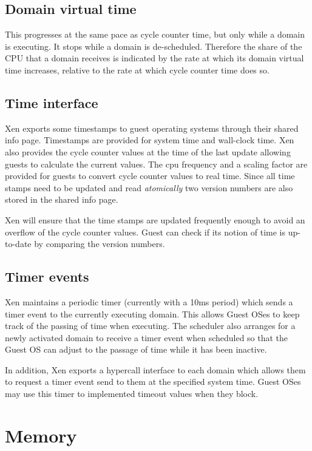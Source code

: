 \documentclass[11pt,twoside,final,openright]{xenstyle}
\begin{document}
\section{Domain virtual time}
This progresses at the same pace as cycle counter time, but only while a
domain is executing. It stops while a domain is de-scheduled. Therefore the
share of the CPU that a domain receives is indicated by the rate at which
its domain virtual time increases, relative to the rate at which cycle
counter time does so.

\section{Time interface}
Xen exports some timestamps to guest operating systems through their shared
info page. Timestamps are provided for system time and wall-clock time. Xen
also provides the cycle counter values at the time of the last update
allowing guests to calculate the current values. The cpu frequency and a
scaling factor are provided for guests to convert cycle counter values to
real time. Since all time stamps need to be updated and read
\emph{atomically} two version numbers are also stored in the shared info
page.

Xen will ensure that the time stamps are updated frequently enough to avoid
an overflow of the cycle counter values. Guest can check if its notion of
time is up-to-date by comparing the version numbers.

\section{Timer events}

Xen maintains a periodic timer (currently with a 10ms period) which sends a
timer event to the currently executing domain. This allows Guest OSes to
keep track of the passing of time when executing. The scheduler also
arranges for a newly activated domain to receive a timer event when
scheduled so that the Guest OS can adjust to the passage of time while it
has been inactive.

In addition, Xen exports a hypercall interface to each domain which allows
them to request a timer event send to them at the specified system
time. Guest OSes may use this timer to implemented timeout values when they
block.

\chapter{Memory}
\end{document}
